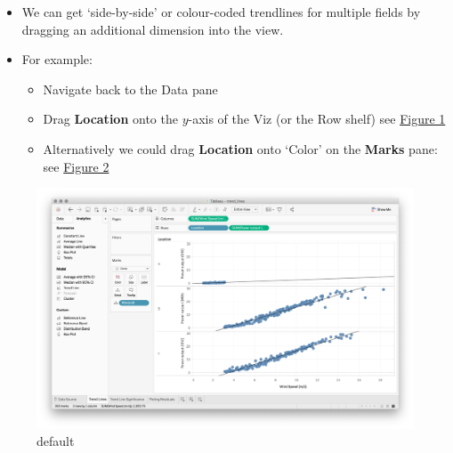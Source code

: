 \documentclass[xcolor=svgnames]{beamer} %
\begin{document}
\begin{frame}
\begin{itemize}
\item We can get `side-by-side' or colour-coded trendlines for multiple fields by dragging an additional dimension into the view.
\item For example:
\begin{itemize}
\item Navigate back to the Data pane
\item Drag {\bf Location} onto the $y$-axis of the Viz (or the Row shelf) see \hyperlink{trippleTrend}{Figure 1}
\item Alternatively we could drag {\bf Location} onto `Color' on the {\bf Marks} pane: see \hyperlink{trippleTrend2}{Figure 2}
\end{itemize}
\end{itemize}
\end{frame}

\begin{frame}
\begin{figure}[htbp]
\begin{center}
\includegraphics[width=.9\textwidth]{img/trippleTrend}
\caption{default}
\label{trippleTrend}
\end{center}
\end{figure}

\end{frame}
\end{document}
